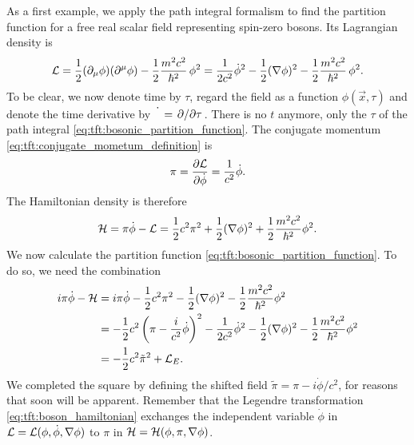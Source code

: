 As a first example, we apply the path integral formalism to find the partition function for a free real scalar field representing spin-zero bosons.
Its Lagrangian density is
\begin{equation}
	\mathcal{L} = \frac{1}{2} (\partial_\mu \phi) (\partial^\mu \phi) - \frac12 \frac{m^2 c^2}{\hbar^2} \, \phi^2
	      = \frac{1}{2 c^2} \dot{\phi}^2 - \frac12 (\nabla \phi)^2  - \frac12 \frac{m^2 c^2}{\hbar^2} \, \phi^2 .
\label{eq:tft:boson_lagrangian}
\end{equation}
To be clear, we now denote time by $\tau$, regard the field as a function $\phi(\vec{x}, \tau)$ and denote the time derivative by $\dot{\phantom{\phi}} = \pdv{}/{\tau}$.
There is no $t$ anymore, only the $\tau$ of the path integral \eqref{eq:tft:bosonic_partition_function}.
The conjugate momentum \eqref{eq:tft:conjugate_mometum_definition} is
\begin{equation}
	\pi = \pdv{\mathcal{L}}{\dot{\phi}} = \frac{1}{c^2} \dot{\phi} .
\end{equation}
The Hamiltonian density is therefore
\begin{equation}
	\mathcal{H} = \pi \dot{\phi} - \mathcal{L} = \frac12 c^2 \pi^2 + \frac12 (\nabla \phi)^2 + \frac12 \frac{m^2 c^2}{\hbar^2} \phi^2 .
\label{eq:tft:boson_hamiltonian}
\end{equation}
We now calculate the partition function \eqref{eq:tft:bosonic_partition_function}.
To do so, we need the combination
\begin{equation}
\begin{split}
	i \pi \dot\phi - \mathcal{H} &= i \pi \dot\phi - \frac{1}{2} c^2 \pi^2 - \frac12 (\nabla \phi)^2 - \frac{1}{2} \frac{m^2 c^2}{\hbar^2} \phi^2 \\
	                      &= -\frac{1}{2} c^2 \left( \pi - \frac{i}{c^2} \dot\phi \right)^2 - \frac{1}{2 c^2} \dot\phi^2 - \frac{1}{2} (\nabla \phi)^2 - \frac{1}{2} \frac{m^2 c^2}{\hbar^2} \phi^2 \\
	                      &= -\frac{1}{2} c^2 \tilde\pi^2 + \mathcal{L}_E . \\
\end{split}
\label{eq:tft:boson_field_combination}
\end{equation}
We completed the square by defining the shifted field $\tilde\pi = \pi - i \dot\phi / c^2$, for reasons that soon will be apparent.
Remember that the Legendre transformation \eqref{eq:tft:boson_hamiltonian} exchanges the independent variable $\dot\phi$ in $\mathcal{L} = \mathcal{L}(\phi, \dot\phi, \nabla\phi)$ to $\pi$ in $\mathcal{H} = \mathcal{H}(\phi, \pi, \nabla\phi)$.

